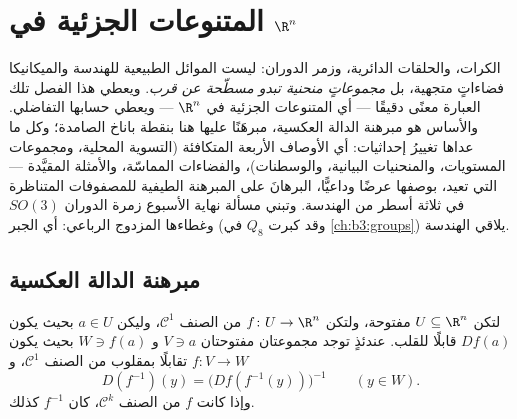 \chapter{المتنوعات الجزئية في \texorpdfstring{$\R^n$}{Rn}}
\label{ch:b3:submanifolds}

الكرات، والحلقات الدائرية، وزمر الدوران: ليست الموائل الطبيعية
للهندسة والميكانيكا فضاءاتٍ متجهية، بل \emph{مجموعاتٍ منحنية
تبدو مسطّحة عن قرب}. ويعطي هذا الفصل تلك العبارة معنًى دقيقًا
--- أي المتنوعات الجزئية في $\R^n$ --- ويعطي حسابها التفاضلي.
والأساس هو مبرهنة الدالة العكسية، مبرهَنًا عليها هنا بنقطة باناخ
الصامدة؛ وكل ما عداها تغييرُ إحداثيات: أي الأوصاف الأربعة
المتكافئة  (التسوية المحلية، ومجموعات
المستويات، والمنحنيات البيانية، والوسطنات)، والفضاءات المماسّة،
والأمثلة المقيَّدة  --- التي تعيد، بوصفها
عرضًا وداعيًّا، البرهانَ على المبرهنة الطيفية للمصفوفات
المتناظرة في ثلاثة أسطر من الهندسة. وتبني مسألة نهاية الأسبوع
زمرة الدوران $SO(3)$ وغطاءها المزدوج الرباعي: أي الجبر (وقد
كبرت $Q_8$ في \cref{ch:b3:groups}) يلاقي الهندسة.

\section{مبرهنة الدالة العكسية}

\begin{theorem}
\label{thm:b3:submanifolds:ift}
لتكن $U \subseteq \R^n$ مفتوحة، ولتكن $f \colon U \to \R^n$ من الصنف $\mathcal C^1$، وليكن
$a \in U$ بحيث يكون $Df(a)$ قابلًا للقلب. عندئذٍ توجد مجموعتان
مفتوحتان $V \ni a$ و $W \ni f(a)$ بحيث يكون $f \colon V \to W$ تقابلًا
بمقلوب من الصنف $\mathcal C^1$، و
\[
D(f^{-1})(y) = \bigl(Df(f^{-1}(y))\bigr)^{-1}
\qquad (y \in W).
\]
وإذا كانت $f$ من الصنف $\mathcal C^k$، كان $f^{-1}$ كذلك.
\end{theorem}

